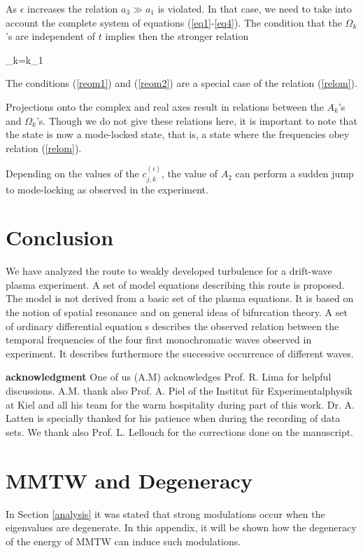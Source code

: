 As $\epsilon$ increases the relation
$a_3 \gg a_1$ is violated.
In that case, we need to take into account the complete system 
of equations (\ref{eq1}-\ref{eq4}).
The condition that the $\Omega_k$'s are independent of $t$
implies then the stronger relation

\beq\label{relom}
\Omega_k=k\Omega_1
\eeq


\begin{rem}
The conditions (\ref{reom1}) and (\ref{reom2}) are 
 a special case of the relation (\ref{relom}).
\end{rem}
Projections onto the complex and real axes result in relations
between the $A_k$'s and $\Omega_k$'s.
Though we do not give these relations here, it is important
to note that the state is now a mode-locked state, that is,
a state where the frequencies obey relation (\ref{relom}).

\begin{rem}
Depending on the values of the $c^{(i)}_{j,k}$, the value of $A_2$
can perform a sudden jump to mode-locking as observed
in the experiment.
\end{rem}




\section{Conclusion}


We have analyzed the route to weakly developed
turbulence for a drift-wave plasma experiment.
A set of model equations  describing this route
is proposed.
The model is not derived from a basic set of the plasma equations.
It is based on the notion of spatial resonance
and on general ideas of bifurcation theory.
A set of ordinary differential equation s
describes the observed relation
between the temporal frequencies of the four first monochromatic waves
observed in experiment.
It describes furthermore the successive occurrence of different waves.

{\bf acknowledgment}
One of us (A.M)  acknowledges Prof. R. Lima for  helpful discussions.
A.M. thank also Prof. A. Piel of the Institut
f\"ur Experimentalphysik at Kiel and all his team for the 
warm hospitality during part of this work.
Dr. A. Latten is specially thanked for his patience when
during the  recording of data sets. We thank also Prof. L. Lellouch
for the corrections done on the manuscript.


\appendix

\section{MMTW and Degeneracy}\label{MMTW}
In Section \ref{analysis} it was stated
that strong modulations occur
when the eigenvalues are degenerate.
In this appendix, it will be shown how the degeneracy
of the energy of MMTW can induce such
modulations.

